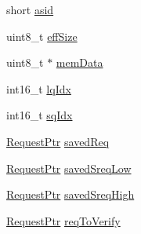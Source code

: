 \begin{DoxyCompactItemize}
\item 
short \hyperlink{classBaseDynInst_a03f3e3cd7500e78001075b53eab05a53}{asid}
\item 
uint8\_\-t \hyperlink{classBaseDynInst_ad52a4366d1b850793e6d979a7459cab4}{effSize}
\item 
uint8\_\-t $\ast$ \hyperlink{classBaseDynInst_a9c9a186aff5eddf449916952b8398116}{memData}
\item 
int16\_\-t \hyperlink{classBaseDynInst_a543896e8c656ce7cce978a1ec4d29afe}{lqIdx}
\item 
int16\_\-t \hyperlink{classBaseDynInst_a9f5a94c5a008c1580f89d38e425a6528}{sqIdx}
\item 
\hyperlink{classRequest}{RequestPtr} \hyperlink{classBaseDynInst_a59b330383a8be2eaba12ac79b9d28dc2}{savedReq}
\item 
\hyperlink{classRequest}{RequestPtr} \hyperlink{classBaseDynInst_a092c24fc1b01745b4611ef36265f778a}{savedSreqLow}
\item 
\hyperlink{classRequest}{RequestPtr} \hyperlink{classBaseDynInst_a0e8cac1ccea0f0428cb39947673bc31c}{savedSreqHigh}
\item 
\hyperlink{classRequest}{RequestPtr} \hyperlink{classBaseDynInst_a7a7e19d3ca6f10eed7c88a377c4cb971}{reqToVerify}
\end{DoxyCompactItemize}
